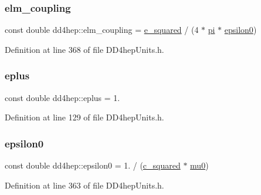 \hypertarget{namespacedd4hep_ace30ae02d909a752d5e3f2138bf4ecb1}{}\label{namespacedd4hep_ace30ae02d909a752d5e3f2138bf4ecb1} 
\subsubsection{\texorpdfstring{elm\+\_\+coupling}{elm\_coupling}}
{\footnotesize\ttfamily const double dd4hep\+::elm\+\_\+coupling = \hyperlink{namespacedd4hep_a23b1828a7d7d90dc182eee3716cf27f6}{e\+\_\+squared} / (4 $\ast$ \hyperlink{namespacedd4hep_ae71f82066d68af053eb8f60d0e13d3af}{pi} $\ast$ \hyperlink{namespacedd4hep_a7838df71bb4bd46b01798c559daadc4b}{epsilon0})\hspace{0.3cm}{\ttfamily [static]}}



Definition at line 368 of file D\+D4hep\+Units.\+h.

\hypertarget{namespacedd4hep_a96ccff254b6dcebf179c3630f6205857}{}\label{namespacedd4hep_a96ccff254b6dcebf179c3630f6205857} 
\subsubsection{\texorpdfstring{eplus}{eplus}}
{\footnotesize\ttfamily const double dd4hep\+::eplus = 1.\hspace{0.3cm}{\ttfamily [static]}}



Definition at line 129 of file D\+D4hep\+Units.\+h.

\hypertarget{namespacedd4hep_a7838df71bb4bd46b01798c559daadc4b}{}\label{namespacedd4hep_a7838df71bb4bd46b01798c559daadc4b} 
\subsubsection{\texorpdfstring{epsilon0}{epsilon0}}
{\footnotesize\ttfamily const double dd4hep\+::epsilon0 = 1. / (\hyperlink{namespacedd4hep_a1501a5f994e55104b62b1907ff652300}{c\+\_\+squared} $\ast$ \hyperlink{namespacedd4hep_aa3e5df0c9242afa74216e69bac6e639b}{mu0})\hspace{0.3cm}{\ttfamily [static]}}



Definition at line 363 of file D\+D4hep\+Units.\+h.

